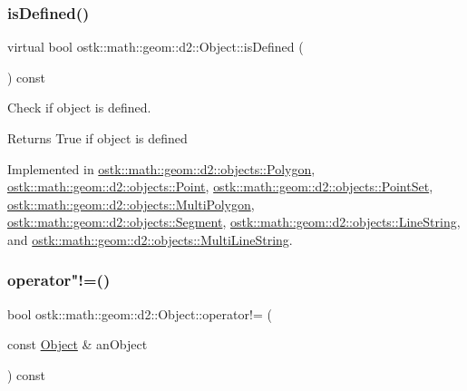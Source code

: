 \subsubsection{\texorpdfstring{is\+Defined()}{isDefined()}}
{\footnotesize\ttfamily virtual bool ostk\+::math\+::geom\+::d2\+::\+Object\+::is\+Defined (\begin{DoxyParamCaption}{ }\end{DoxyParamCaption}) const\hspace{0.3cm}{\ttfamily [pure virtual]}}



Check if object is defined. 

\begin{DoxyReturn}{Returns}
True if object is defined 
\end{DoxyReturn}


Implemented in \hyperlink{classostk_1_1math_1_1geom_1_1d2_1_1objects_1_1_polygon_a81f92393dad2c6421fd4fe3834f60fa2}{ostk\+::math\+::geom\+::d2\+::objects\+::\+Polygon}, \hyperlink{classostk_1_1math_1_1geom_1_1d2_1_1objects_1_1_point_a245dd2f0268e1f162804489ac911cb0c}{ostk\+::math\+::geom\+::d2\+::objects\+::\+Point}, \hyperlink{classostk_1_1math_1_1geom_1_1d2_1_1objects_1_1_point_set_a6b2dd586eeb7f4fbf659fa9810574315}{ostk\+::math\+::geom\+::d2\+::objects\+::\+Point\+Set}, \hyperlink{classostk_1_1math_1_1geom_1_1d2_1_1objects_1_1_multi_polygon_a27e84e80acbae4c2a7436a4d5c07b576}{ostk\+::math\+::geom\+::d2\+::objects\+::\+Multi\+Polygon}, \hyperlink{classostk_1_1math_1_1geom_1_1d2_1_1objects_1_1_segment_a4e7397f14fd36b0aecd7afddd4fddf84}{ostk\+::math\+::geom\+::d2\+::objects\+::\+Segment}, \hyperlink{classostk_1_1math_1_1geom_1_1d2_1_1objects_1_1_line_string_a0fd7edff5727e1373dbea759313313cc}{ostk\+::math\+::geom\+::d2\+::objects\+::\+Line\+String}, and \hyperlink{classostk_1_1math_1_1geom_1_1d2_1_1objects_1_1_multi_line_string_a446d9d1344336d6ec8b2ff1e46629ca2}{ostk\+::math\+::geom\+::d2\+::objects\+::\+Multi\+Line\+String}.

\mbox{\label{classostk_1_1math_1_1geom_1_1d2_1_1_object_a10e035f09ac34d04901485d494681ff6}} 
\subsubsection{\texorpdfstring{operator"!=()}{operator!=()}}
{\footnotesize\ttfamily bool ostk\+::math\+::geom\+::d2\+::\+Object\+::operator!= (\begin{DoxyParamCaption}\item[{const \hyperlink{classostk_1_1math_1_1geom_1_1d2_1_1_object}{Object} \&}]{an\+Object }\end{DoxyParamCaption}) const}



